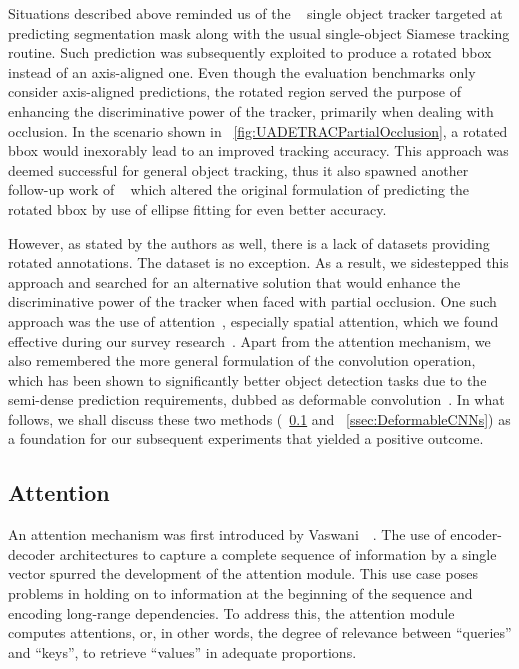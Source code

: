Situations described above reminded us of the \siammask{}~\cite{wang2019siammask} single object tracker targeted at predicting segmentation mask along with the usual single-object Siamese tracking routine. Such prediction was subsequently exploited to produce a rotated \gls{bbox} instead of an axis-aligned one. Even though the evaluation benchmarks only consider axis-aligned predictions, the rotated region served the purpose of enhancing the discriminative power of the tracker, primarily when dealing with occlusion. In the scenario shown in \figtext{}~\ref{fig:UADETRACPartialOcclusion}, a rotated \gls{bbox} would inexorably lead to an improved tracking accuracy. This approach was deemed successful for general object tracking, thus it also spawned another follow-up work of \siammaske{}~\cite{chen2019rotbboxes} which altered the original formulation of predicting the rotated \gls{bbox} by use of ellipse fitting for even better accuracy.

However, as stated by the authors as well, there is a lack of datasets providing rotated annotations. The \uadetrac{} dataset is no exception. As a result, we sidestepped this approach and searched for an alternative solution that would enhance the discriminative power of the tracker when faced with partial occlusion. One such approach was the use of attention~\cite{vaswani2017attention}, especially spatial attention, which we found effective during our survey research~\cite{ondrasovic2021siamese}. Apart from the attention mechanism, we also remembered the more general formulation of the convolution operation, which has been shown to significantly better object detection tasks due to the semi-dense prediction requirements, dubbed as deformable convolution~\cite{dai2017dcnn}. In what follows, we shall discuss these two methods (\sectiontext{}~\ref{ssec:Attention} and \sectiontext{}~\ref{ssec:DeformableCNNs}) as a foundation for our subsequent experiments that yielded a positive outcome.

\subsection{Attention}
\label{ssec:Attention}

An attention mechanism was first introduced by Vaswani~\etal{}~\cite{vaswani2017attention}. The use of encoder-decoder architectures to capture a complete sequence of information by a single vector spurred the development of the attention module. This use case poses problems in holding on to information at the beginning of the sequence and encoding long-range dependencies. To address this, the attention module computes attentions, or, in other words, the degree of relevance between ``queries'' and ``keys'', to retrieve ``values'' in adequate proportions.

